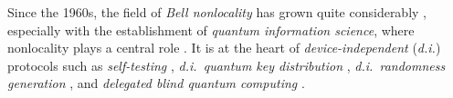Since the 1960s, the field of \emph{Bell nonlocality} has grown quite considerably \cite{brunner}, especially with the establishment of \emph{quantum information science}, where nonlocality plays a central role \cite{nielsen_quantum_2010}. It is at the heart of \emph{device-independent} (\emph{d.i.}) protocols such as \emph{self-testing} \cite{2020-self-testing-a-review}, \emph{d.i.\ quantum key distribution} \cite{di-qkd}, \emph{d.i.\ randomness generation} \cite{di-random}, and \emph{delegated blind quantum computing} \cite{blind-aaronson}.












